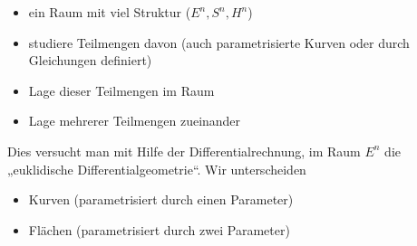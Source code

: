 \begin{itemize}
	\item
		ein Raum mit viel Struktur ($E^n, S^n, H^n$)
	\item
		studiere Teilmengen davon (auch parametrisierte Kurven oder durch Gleichungen definiert)
	\item
		Lage dieser Teilmengen im Raum
	\item
		Lage mehrerer Teilmengen zueinander
\end{itemize}
Dies versucht man mit Hilfe der Differentialrechnung, im Raum $E^n$ die „euklidische Differentialgeometrie“.
Wir unterscheiden
\begin{itemize}
	\item
		Kurven (parametrisiert durch einen Parameter)
	\item
		Flächen (parametrisiert durch zwei Parameter)
\end{itemize}



